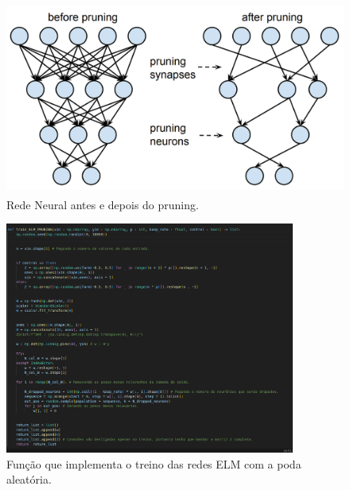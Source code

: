 \documentclass{article}
\begin{document}
\begin{figure}[h]

    \centering
    \includegraphics[height=2.5in]{n_net_after_before_pruning.png}
    \caption{Rede Neural antes e depois do pruning.}
    \label{fig:example}
    
\end{figure}

\newpage

\begin{figure}[h]

    \centering
    \includegraphics[height=3in]{random_prun.png}
    \caption{Função que implementa o treino das redes ELM com a poda aleatória.}
    \label{fig:example}
    
\end{figure}

\vspace{15pt}
\end{document}

